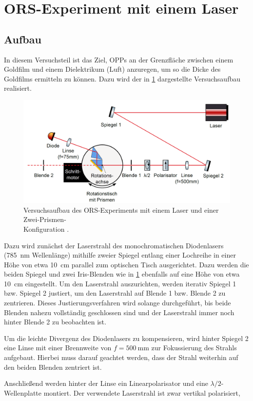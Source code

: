 \section{ORS-Experiment mit einem Laser}\label{sec:versuchsteil1}
\subsection{Aufbau}\label{subsec:teil1_aufbau}
In diesem Versuchsteil ist das Ziel, OPPs an der Grenzfläche zwischen einem Goldfilm und einem Dielektrikum (Luft)
anzuregen, um so die Dicke des Goldfilms ermitteln zu können. Dazu wird der in \cref{fig:versuchsteil1_aufbau} dargestellte Versuchsaufbau realisiert.
\begin{figure}[H]
	\centering
	\includegraphics[width=0.6\linewidth]{../figs/versuchsteil1_aufbau.png}
	\caption{Versuchsaufbau des ORS-Experiments mit einem Laser und einer Zwei-Prismen-\\Konfiguration \cite{skript}.}
	\label{fig:versuchsteil1_aufbau}
\end{figure} Dazu wird zunächst der Laserstrahl des monochromatischen Diodenlasers (\SI{785}{\nano \meter} Wellenlänge) mithilfe zweier Spiegel entlang einer Lochreihe
in einer Höhe von etwa \SI{10}{\cm} parallel zum optischen Tisch ausgerichtet. Dazu werden die beiden Spiegel und zwei Iris-Blenden wie in \cref{fig:versuchsteil1_aufbau}
ebenfalls auf eine Höhe von etwa \SI{10}{\cm} eingestellt. Um den Laserstrahl auszurichten, werden iterativ Spiegel 1 bzw. Spiegel 2 justiert, um den Laserstrahl
auf Blende 1 bzw. Blende 2 zu zentrieren. Dieses Justierungsverfahren wird solange durchgeführt, bis beide Blenden nahezu vollständig geschlossen sind und der Laserstrahl
immer noch hinter Blende 2 zu beobachten ist.\par
Um die leichte Divergenz des Diodenlasers zu kompensieren, wird hinter Spiegel 2 eine Linse mit einer Brennweite von $f = \SI{500}{\mm}$ zur Fokussierung
des Strahls aufgebaut. Hierbei muss darauf geachtet werden, dass der Strahl weiterhin auf den beiden Blenden zentriert ist.\par
Anschließend werden hinter der Linse ein Linearpolarisator und eine $\lambda/2$-Wellenplatte montiert. Der verwendete Laserstrahl ist zwar vertikal polarisiert,
